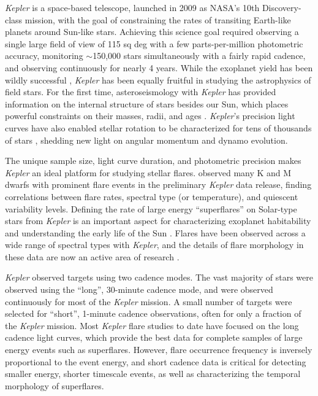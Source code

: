 \documentclass[twocolumn]{aastex6}
\newcommand{\Kepler}{\textsl{Kepler}\xspace}
\begin{document}
\Kepler is a space-based telescope, launched in 2009 as NASA's 10th Discovery-class mission, with the goal of constraining the rates of transiting Earth-like planets around Sun-like stars. Achieving this science goal required observing a single large field of view of 115 sq deg with a few parts-per-million photometric accuracy, monitoring $\sim$150,000 stars simultaneously with a fairly rapid cadence, and observing continuously for nearly 4 years. While the exoplanet yield has been wildly successful \citep[e.g.][]{jenkins2015}, \Kepler has been equally fruitful in studying the astrophysics of field stars. For the first time, asteroseismology with \Kepler has provided information on the internal structure of stars besides our Sun, which places powerful constraints on their masses, radii, and ages \citep{chaplin2010,chaplin2013}. \Kepler's precision light curves have also enabled stellar rotation to be characterized for tens of thousands of stars \citep{reinhold2013,mcquillan2014}, shedding new light on angular momentum and dynamo evolution.

The unique sample size, light curve duration, and photometric precision makes \Kepler an ideal platform for studying stellar flares. \citet{walkowicz2011} observed many K and M dwarfs with prominent flare events in the preliminary \Kepler data release, finding correlations between flare rates, spectral type (or temperature), and quiescent variability levels. Defining the rate of large energy ``superflares'' on Solar-type stars from \Kepler is an important aspect for characterizing exoplanet habitability and understanding the early life of the Sun \citep{maehara2015}. Flares have been observed across a wide range of spectral types with \Kepler \citep{balona2015}, and the details of flare morphology in these data are now an active area of research \citep[e.g.][]{davenport2014b, pugh2015}.


\Kepler observed targets using two cadence modes. The vast majority of stars were observed using the ``long'', 30-minute cadence mode, and were observed continuously for most of the \Kepler mission. A small number of targets were selected for ``short'', 1-minute cadence observations, often for only a fraction of the \Kepler mission. Most \Kepler flare studies to date have focused on the long cadence light curves, which provide the best data for complete samples of large energy events such as superflares. However, flare occurrence frequency is inversely proportional to the event energy, and short cadence data is critical for detecting smaller energy, shorter timescale events, as well as characterizing the temporal morphology of superflares.
\end{document}
